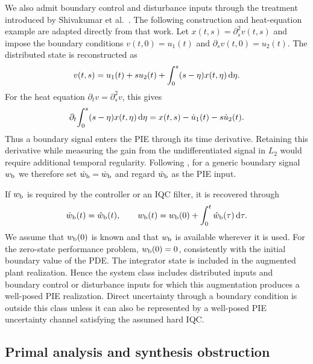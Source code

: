 We also admit boundary control and disturbance inputs through the treatment
introduced by Shivakumar et al.~\cite[Sec.~III-B]{shivaknew}. The following
construction and heat-equation example are adapted directly from that work.
Let $x(t,s)=\partial_s^2v(t,s)$ and impose the boundary conditions
$v(t,0)=u_1(t)$ and $\partial_sv(t,0)=u_2(t)$. The distributed state is
reconstructed as
\begin{equation}\label{eq:boundary-input-reconstruction}
v(t,s)=u_1(t)+su_2(t)
+\int_0^s(s-\eta)x(t,\eta)\,{\mathrm{d}}\eta.
\end{equation}
For the heat equation $\partial_tv=\partial_s^2v$, this gives
\begin{equation}\label{eq:boundary-input-pie}
\partial_t\!\int_0^s(s-\eta)x(t,\eta)\,{\mathrm{d}}\eta
=x(t,s)-\dot u_1(t)-s\dot u_2(t).
\end{equation}
Thus a boundary signal enters the PIE through its time derivative. Retaining
this derivative while measuring the gain from the undifferentiated signal in
$L_2$ would require additional temporal regularity. Following
\cite{shivaknew}, for a generic boundary signal $w_{{\mathrm{b}}}$ we therefore set
$\hat w_{{\mathrm{b}}}=\dot w_{{\mathrm{b}}}$ and regard $\hat w_{{\mathrm{b}}}$ as the PIE
input.

If $w_{{\mathrm{b}}}$ is required by the controller or an IQC filter, it is
recovered through
\begin{equation}\label{eq:boundary-input-integrator}
\dot w_{{\mathrm{b}}}(t)=\hat w_{{\mathrm{b}}}(t),
\qquad
w_{{\mathrm{b}}}(t)=w_{{\mathrm{b}}}(0)
+\int_0^t\hat w_{{\mathrm{b}}}(\tau)\,{\mathrm{d}}\tau.
\end{equation}
We assume that $w_{{\mathrm{b}}}(0)$ is known and that $w_{{\mathrm{b}}}$ is available
wherever it is used. For the zero-state performance problem,
$w_{{\mathrm{b}}}(0)=0$, consistently with the initial boundary value of the PDE.
The integrator state is included in the augmented plant realization. Hence the
system class includes distributed inputs and boundary control or disturbance
inputs for which this augmentation produces a well-posed PIE realization.
Direct uncertainty through a boundary condition is outside this class unless
it can also be represented by a well-posed PIE uncertainty channel satisfying
the assumed hard IQC.

\subsection{Primal analysis and synthesis obstruction}

